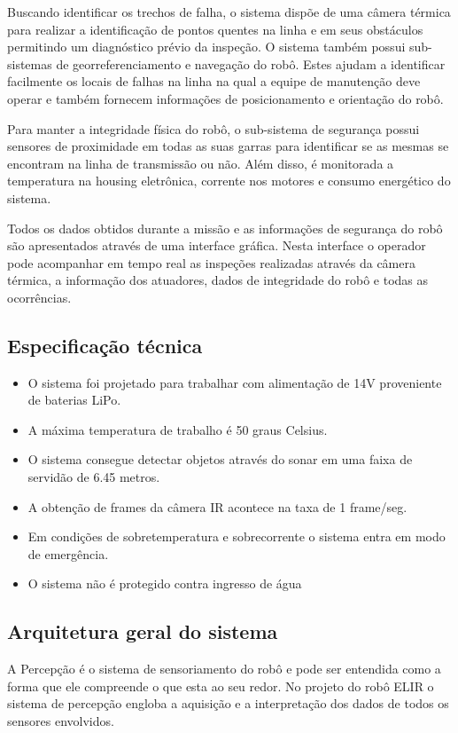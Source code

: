 Buscando identificar os trechos de falha, o sistema dispõe de uma câmera térmica para realizar a identificação de pontos quentes na linha e em seus obstáculos permitindo um diagnóstico prévio da inspeção. O sistema também possui sub-sistemas de georreferenciamento e navegação do robô. Estes ajudam a identificar facilmente os locais de falhas na linha na qual a equipe de manutenção deve operar e também fornecem informações de posicionamento e orientação do robô.

Para manter a integridade física do robô, o sub-sistema de segurança possui sensores de proximidade em todas as suas garras para identificar se as mesmas se encontram na linha de transmissão ou não. Além disso, é monitorada a temperatura na housing eletrônica, corrente nos motores e consumo energético do sistema. 


Todos os dados obtidos durante a missão e as informações de segurança do robô são apresentados através de uma interface gráfica. Nesta interface o operador pode acompanhar em tempo real as inspeções realizadas através da câmera térmica, a informação dos atuadores, dados de integridade do robô e todas as ocorrências. 

\subsection{Especificação técnica}
\label{ssec:espt}

\begin{itemize}
\item O sistema foi projetado para trabalhar com alimentação de 14V proveniente de baterias LiPo.
\item A máxima temperatura de trabalho é 50 graus Celsius.
\item O sistema consegue detectar objetos através do sonar em uma faixa de servidão de 6.45 metros.
\item A obtenção de frames da câmera IR acontece na taxa de 1 frame/seg.
\item Em condições de sobretemperatura e sobrecorrente o sistema entra em modo de emergência.
\item O sistema não é protegido contra ingresso de água
\end{itemize} 




\subsection{Arquitetura geral do sistema}
\label{ssec:arqg}
A Percepção é o sistema de sensoriamento do robô e pode ser entendida como a forma que ele compreende o que esta ao seu redor. No projeto do robô ELIR o sistema de percepção engloba a aquisição e a interpretação dos dados de todos os sensores envolvidos.

